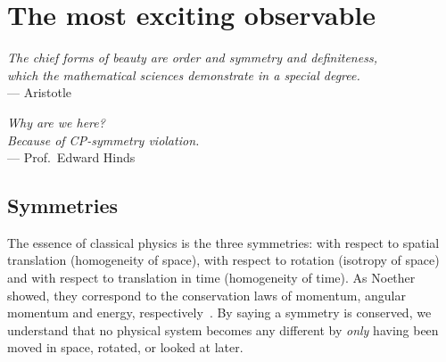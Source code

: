 \chapter{The most exciting observable}
\label{ch:nedm-at-psi}




\begin{flushright}{\slshape    
  The chief forms of beauty are order and symmetry and definiteness,\\
  which the mathematical sciences demonstrate in a special degree.} \\ \medskip
--- Aristotle
\end{flushright}

\bigskip

\begin{flushright}{\slshape    
  Why are we here?\\
  Because of CP-symmetry violation.} \\ \medskip
--- Prof.\ Edward Hinds
\end{flushright}

\bigskip

\section{Symmetries}


The essence of classical physics is the three symmetries: with respect to spatial translation (homogeneity of space), with respect to rotation (isotropy of space) and with respect to translation in time (homogeneity of time). As Noether showed, they correspond to the conservation laws of momentum, angular momentum and energy, respectively~\cite{Noether1918}. By saying a symmetry is conserved, we understand that no physical system becomes any different by \emph{only} having been moved in space, rotated, or looked at later.

